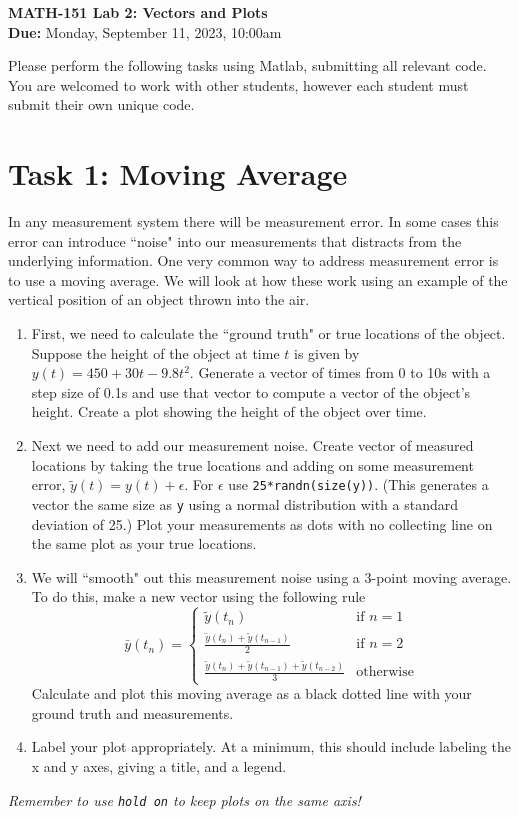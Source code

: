 \documentclass[11pt]{article}
\begin{document}
	
	\begin{center}
		\Large{\textbf{MATH-151 Lab 2: Vectors and Plots}}\\
			\medskip
		\normalsize{\textbf{Due:} Monday, September 11, 2023, 10:00am} 
	\end{center}
	\noindent\makebox[\linewidth]{\rule{\textwidth}{0.4pt}}
	Please perform the following tasks using Matlab, submitting all relevant code. You are welcomed to work with other students, however each student must submit their own unique code.
	\section*{Task 1: Moving Average}
	\noindent In any measurement system there will be measurement error. In some cases this error can introduce ``noise" into our measurements that distracts from the underlying information. One very common way to address measurement error is to use a moving average. We will look at how these work using an example of the vertical position of an object thrown into the air.\\
	\begin{enumerate}[label=\alph*)]
		\item First, we need to calculate the ``ground truth" or true locations of the object. Suppose the height of the object at time $t$ is given by $y(t) = 450 + 30t - 9.8t^2$. Generate a vector of times from 0 to 10s with a step size of 0.1s and use that vector to compute a vector of the object's height. Create a plot showing the height of the object over time.
		\item Next we need to add our measurement noise. Create vector of measured locations by taking the true locations and adding on some measurement error, $\tilde{y}(t) = y(t) + \epsilon$. For $\epsilon$ use \texttt{25*randn(size(y))}. (This generates a vector the same size as \texttt{y} using a normal distribution with a standard deviation of 25.) Plot your measurements as dots with no collecting line on the same plot as your true locations.
		\item We will ``smooth" out this measurement noise using a 3-point moving average. To do this, make a new vector using the following rule
		\begin{equation*}
			\bar{y}(t_n) =  \begin{cases}
				\tilde{y}(t_n) & \text{if } n=1 \\
				\frac{\tilde{y}(t_n) + \tilde{y}(t_{n-1})}{2} & \text{if } n=2 \\
				\frac{\tilde{y}(t_n) + \tilde{y}(t_{n-1}) +\tilde{y}(t_{n-2})}{3} & \text{otherwise}
			\end{cases}
		\end{equation*}
		Calculate and plot this moving average as a black dotted line with your ground truth and measurements.
		\item Label your plot appropriately. At a minimum, this should include labeling the x and y axes, giving a title, and a legend.
	\end{enumerate}

	\begin{center}
		\vfill
		\textit{Remember to use \texttt{hold on} to keep plots on the same axis!}
	\end{center}
\end{document}
